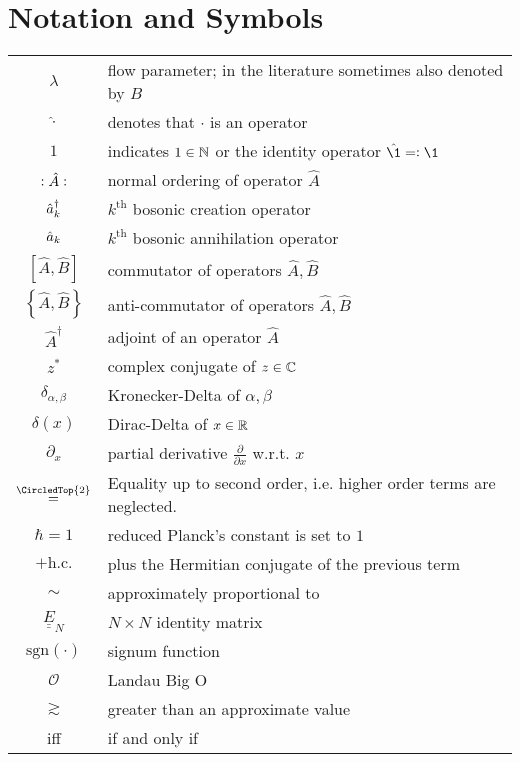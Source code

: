 \chapter*{Notation and Symbols}
\begin{tabular}{cp{}}
  $\lambda$ & flow parameter; in the literature sometimes also denoted by $B$ \\
  $\hat\cdot$ & denotes that $\cdot$ is an operator\\
  $1$ & indicates $1\in\mathbb{N}$ or the identity operator $\hat{\1}\eqdef \1$\\
  $\vcentcolon \hat A\vcentcolon$ & normal ordering of operator $\hat A$\\ 
  $\hat a^\dagger_k$ & $k^\mathrm{th}$ bosonic creation operator \\
  $\hat a_k$ & $k^\mathrm{th}$ bosonic annihilation operator \\
  $[\hat{ A},\hat{ B}]$ & commutator of operators $\hat{ A},\hat{ B}$ \\
  $\left\{\hat{ A},\hat{ B}\right\}$ & anti-commutator of operators $\hat{ A},\hat{ B}$ \\
  $\hat A^\dagger$ & adjoint of an operator $\hat{ A}$ \\
  $z^*$ & complex conjugate of $z\in\mathbb{C}$ \\
  $\delta_{\alpha,\beta}$ & Kronecker-Delta of $\alpha,\beta$ \\ 
  $\delta (x)$ & Dirac-Delta of $x\in\mathbb{R}$\\
  $\partial_x$ & partial derivative $\frac{\partial}{\partial x}$ w.r.t. $x$\\
  $\overset{\CircledTop{2}}{=}$ & Equality up to second order, i.e. higher order terms are neglected.\\
  $\hbar=1$ & reduced Planck's constant is set to $1$\\
  $+\mathrm{h.c.}$ & plus the Hermitian conjugate of the previous term\\
  $\sim$ & approximately proportional to\\
  $\underline{\underline E}_N$ & $N\times N$ identity matrix\\
  $\mathrm{sgn}\left(\cdot\right)$ & signum function\\
  $\mathcal O$ & Landau Big O\\
  $\gtrsim$ & greater than an approximate value\\
  iff & if and only if
\end{tabular}\\







